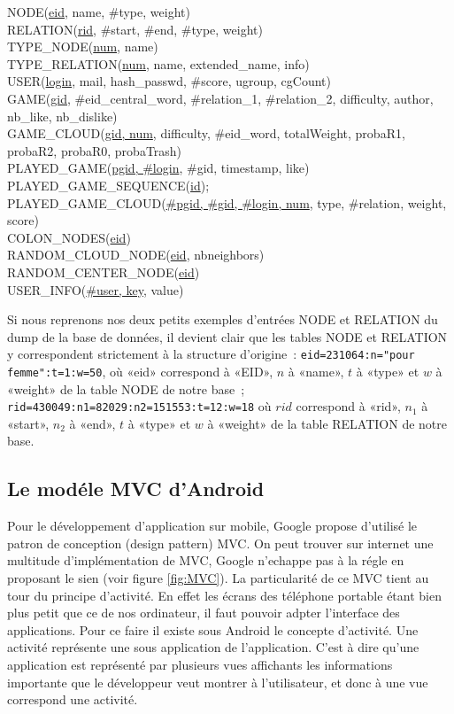 \documentclass[a4paper,11pt,french]{article}
\def\android{Android\texttrademark{}}
\begin{document}
{\footnotesize
NODE(\underline{eid}, name, \#type, weight) \\ 
RELATION(\underline{rid}, \#start, \#end, \#type, weight) \\
TYPE\_NODE(\underline{num}, name) \\
TYPE\_RELATION(\underline{num}, name, extended\_name, info) \\
USER(\underline{login}, mail, hash\_passwd, \#score, ugroup, cgCount) \\
GAME(\underline{gid}, \#eid\_central\_word, \#relation\_1, \#relation\_2, difficulty, author, nb\_like, nb\_dislike) \\
GAME\_CLOUD(\underline{gid, num}, difficulty, \#eid\_word, totalWeight, probaR1, probaR2, probaR0, probaTrash) \\
PLAYED\_GAME(\underline{pgid, \#login}, \#gid, timestamp, like) \\
PLAYED\_GAME\_SEQUENCE(\underline{id}); \\
PLAYED\_GAME\_CLOUD(\underline{\#pgid, \#gid, \#login, num}, type, \#relation, weight, score)  \\
COLON\_NODES(\underline{eid}) \\
RANDOM\_CLOUD\_NODE(\underline{eid}, nbneighbors) \\
RANDOM\_CENTER\_NODE(\underline{eid}) \\
USER\_INFO(\underline{\#user, key}, value) \\
}

Si nous reprenons nos deux petits exemples d'entrées NODE et RELATION du dump de la base de données, il devient clair que les tables NODE et
RELATION y correspondent strictement à la structure d'origine~: \verb!eid=231064:n="pour femme":t=1:w=50!, où «eid» correspond à «EID», $n$ à
«name», $t$ à «type» et $w$ à «weight» de la table NODE de notre base~; \verb!rid=430049:n1=82029:n2=151553:t=12:w=18! où $rid$ correspond à «rid»,
$n_1$ à «start», $n_2$ à «end», $t$ à «type» et $w$ à «weight» de la table RELATION de notre base.


\subsection{Le modéle MVC d'\android{}}
Pour le développement d'application sur mobile, Google propose d'utilisé le patron de conception (design pattern) MVC. On peut trouver sur internet une multitude d'implémentation de MVC, Google n'echappe pas à la régle en proposant
le sien (voir figure \ref{fig:MVC}).
La particularité de ce MVC tient au tour du principe d'activité. En effet les écrans des téléphone portable étant bien plus petit que ce de nos ordinateur, il faut pouvoir adpter l'interface des applications. Pour ce faire il existe
sous \android{} le concepte d'activité.
Une activité représente une sous application de l'application. C'est à dire qu'une application est représenté par plusieurs vues affichants les informations importante que le développeur veut montrer à l'utilisateur, et donc à une vue
correspond une activité.
\end{document}
